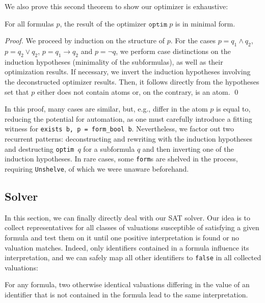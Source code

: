 We also prove this second theorem to show our optimizer is exhaustive:
\begin{theorem}
    For all formulas $p$, the result of the optimizer $\texttt{optim}\;p$ is in minimal form.
\end{theorem}
\begin{proof}
    We proceed by induction on the structure of $p$.
    For the cases $p = q_1 \land q_2$, $p = q_2 \lor q_2$, $p = q_1 \rightarrow q_2$ and $p = \neg q$, we perform case distinctions on the induction hypotheses (minimality of the subformulas), as well as their optimization results.
    If necessary, we invert the induction hypotheses involving the deconstructed optimizer results.
    Then, it follows directly from the hypotheses set that $p$ either does not contain atoms or, on the contrary, is an atom. \qed
\end{proof}
In this proof, many cases are similar, but, e.g., differ in the atom $p$ is equal to, reducing the potential for automation, as one must carefully introduce a fitting witness for \texttt{exists b, p = form\_bool b}.
Nevertheless, we factor out two recurrent patterns: deconstructing and rewriting with the induction hypotheses and destructing \texttt{optim $q$} for a subformula $q$ and then inverting one of the induction hypotheses. In rare cases, some \texttt{form}s are shelved in the process, requiring \texttt{Unshelve}, of which we were unaware beforehand.

\subsection{Solver}

In this section, we can finally directly deal with our SAT solver.
Our idea is to collect representatives for all classes of valuations susceptible of satisfying a given formula and test them on it until one positive interpretation is found or no valuation matches.
Indeed, only identifiers contained in a formula influence its interpretation, and we can safely map all other identifiers to \texttt{false} in all collected valuations:
\begin{lemma}
    For any formula, two otherwise identical valuations differing in the value of an identifier that is not contained in the formula lead to the same interpretation.
\end{lemma}

